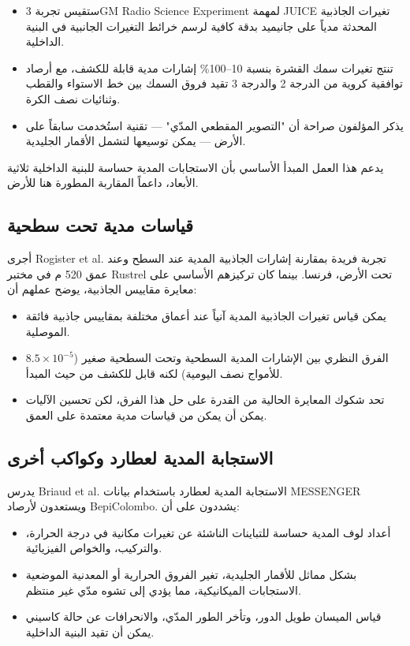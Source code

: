 \documentclass[12pt,a4paper]{article}
\theoremstyle{remark}
\begin{document}
	\begin{itemize}
		\item ستقيس تجربة 3GM Radio Science Experiment لمهمة JUICE تغيرات الجاذبية المحدثة مدياً على جانيميد بدقة كافية لرسم خرائط التغيرات الجانبية في البنية الداخلية.
		\item تنتج تغيرات سمك القشرة بنسبة 10–100\% إشارات مدية قابلة للكشف، مع أرصاد توافقية كروية من الدرجة 2 والدرجة 3 تقيد فروق السمك بين خط الاستواء والقطب وثنائيات نصف الكرة.
		\item يذكر المؤلفون صراحة أن "التصوير المقطعي المدّي" — تقنية استُخدمت سابقاً على الأرض — يمكن توسيعها لتشمل الأقمار الجليدية.
	\end{itemize}
	
	يدعم هذا العمل المبدأ الأساسي بأن الاستجابات المدية حساسة للبنية الداخلية ثلاثية الأبعاد، داعماً المقاربة المطورة هنا للأرض.
	
	\subsection{قياسات مدية تحت سطحية}
	
	أجرى Rogister et al. \cite{Rogister2024} تجربة فريدة بمقارنة إشارات الجاذبية المدية عند السطح وعند عمق 520 م في مختبر Rustrel تحت الأرض، فرنسا. بينما كان تركيزهم الأساسي على معايرة مقاييس الجاذبية، يوضح عملهم أن:
	
	\begin{itemize}
		\item يمكن قياس تغيرات الجاذبية المدية آنياً عند أعماق مختلفة بمقاييس جاذبية فائقة الموصلية.
		\item الفرق النظري بين الإشارات المدية السطحية وتحت السطحية صغير (\(8.5 \times 10^{-5}\) للأمواج نصف اليومية) لكنه قابل للكشف من حيث المبدأ.
		\item تحد شكوك المعايرة الحالية من القدرة على حل هذا الفرق، لكن تحسين الآليات يمكن أن يمكن من قياسات مدية معتمدة على العمق.
	\end{itemize}
	
	\subsection{الاستجابة المدية لعطارد وكواكب أخرى}
	
	يدرس Briaud et al. \cite{Briaud2025} الاستجابة المدية لعطارد باستخدام بيانات MESSENGER ويستعدون لأرصاد BepiColombo. يشددون على أن:
	
	\begin{itemize}
		\item أعداد لوف المدية حساسة للتباينات الناشئة عن تغيرات مكانية في درجة الحرارة، والتركيب، والخواص الفيزيائية.
		\item بشكل مماثل للأقمار الجليدية، تغير الفروق الحرارية أو المعدنية الموضعية الاستجابات الميكانيكية، مما يؤدي إلى تشوه مدّي غير منتظم.
		\item قياس الميسان طويل الدور، وتأخر الطور المدّي، والانحرافات عن حالة كاسيني يمكن أن تقيد البنية الداخلية.
	\end{itemize}
	
\end{document}
